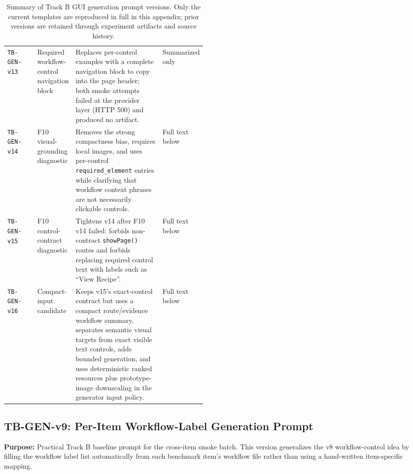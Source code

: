 \begin{table}[ht]
\begin{tabularx}{\linewidth}{>{\raggedright\arraybackslash}p{0.15\linewidth}>{\raggedright\arraybackslash}p{0.16\linewidth}>{\raggedright\arraybackslash}X>{\raggedright\arraybackslash}p{0.16\linewidth}}
\texttt{TB-GEN-v13} & Required workflow-control navigation block & Replaces per-control examples with a complete navigation block to copy into the page header; both smoke attempts failed at the provider layer (HTTP 500) and produced no artifact. & Summarized only \\
\texttt{TB-GEN-v14} & F10 visual-grounding diagnostic & Removes the strong compactness bias, requires local images, and uses per-control \texttt{required\_element} entries while clarifying that workflow context phrases are not necessarily clickable controls. & Full text below \\
\texttt{TB-GEN-v15} & F10 control-contract diagnostic & Tightens v14 after F10 v14 failed: forbids non-contract \texttt{showPage()} routes and forbids replacing required control text with labels such as ``View Recipe''. & Full text below \\
\texttt{TB-GEN-v16} & Compact-input candidate & Keeps v15's exact-control contract but uses a compact route/evidence workflow summary, separates semantic visual targets from exact visible text controls, adds bounded generation, and uses deterministic ranked resources plus prototype-image downscaling in the generator input policy. & Full text below \\
\bottomrule
\end{tabularx}
\caption{Summary of Track B GUI generation prompt versions. Only the current
templates are reproduced in full in this appendix; prior versions are retained
through experiment artifacts and source history.}
\label{tab:track-b-generation-prompt-history}
\end{table}

\subsection{TB-GEN-v9: Per-Item Workflow-Label Generation Prompt}
\label{app:prompt-tb-gen-v9}

\textbf{Purpose:} Practical Track B baseline prompt for the cross-item smoke
batch. This version generalizes the v8 workflow-control idea by filling the
workflow label list automatically from each benchmark item's workflow file
rather than using a hand-written item-specific mapping.

